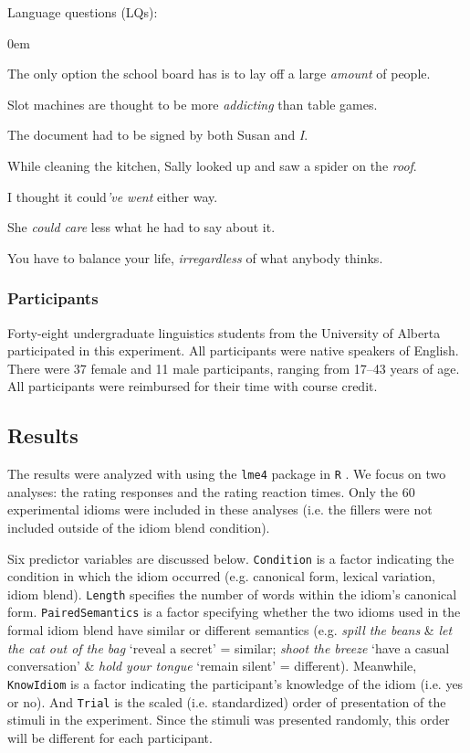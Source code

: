 \documentclass[output=paper,modfonts,nonflat]{langsci/langscibook}
\begin{document}
{\sc Language questions} (LQs):
\begin{enumerate}
\small{
\itemsep0em
\item The only option the school board has is to lay off a large \textit{amount} of people.
\item Slot machines are thought to be more \textit{addicting} than table games.
\item The document had to be signed by both Susan and \textit{I}.
\item While cleaning the kitchen, Sally looked up and saw a spider on the \textit{roof}.
\item I thought it could\textit{'ve went} either way.
\item She \textit{could care} less what he had to say about it.
\item You have to balance your life, \textit{irregardless} of what anybody thinks.
}
\end{enumerate}


\subsubsection{Participants}

Forty-eight undergraduate linguistics students from the University of Alberta participated in this experiment. All participants were native speakers of English. There were 37 female and 11 male participants, ranging from 17--43 years of age. All participants were reimbursed for their time with course credit.


\subsection{Results}

The results were analyzed with  using the \texttt{lme4} package \citep{BatesEtAl2015} in \texttt{R} \citep{R}. We focus on two analyses: the rating responses and the rating reaction times. Only the 60 experimental idioms were included in these analyses (i.e. the fillers were not included outside of the idiom blend condition). %

Six predictor variables are discussed below. \texttt{Condition} is a factor indicating the condition in which the idiom occurred (e.g. canonical form, lexical variation, idiom blend). \texttt{Length} specifies the number of words within the idiom's canonical form. \texttt{PairedSemantics} is a factor specifying whether the two idioms used in the formal idiom blend have similar or different semantics (e.g. \textit{spill the beans} \& \textit{let the cat out of the bag} `reveal a secret' = similar; \textit{shoot the breeze} `have a casual conversation' \& \textit{hold your tongue} `remain silent' = different). Meanwhile, \texttt{KnowIdiom} is a factor indicating the participant's knowledge of the idiom (i.e. yes or no). And \texttt{Trial} is the scaled (i.e. standardized) order of presentation of the stimuli in the experiment. Since the stimuli was presented randomly, this order will be different for each participant. 
\end{document}

